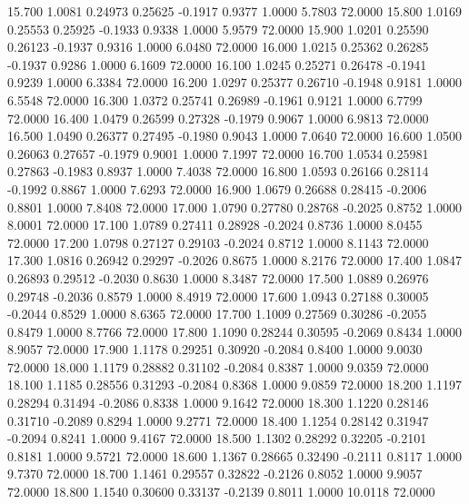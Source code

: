   15.700   1.0081   0.24973   0.25625  -0.1917   0.9377   1.0000   5.7803  72.0000
  15.800   1.0169   0.25553   0.25925  -0.1933   0.9338   1.0000   5.9579  72.0000
  15.900   1.0201   0.25590   0.26123  -0.1937   0.9316   1.0000   6.0480  72.0000
  16.000   1.0215   0.25362   0.26285  -0.1937   0.9286   1.0000   6.1609  72.0000
  16.100   1.0245   0.25271   0.26478  -0.1941   0.9239   1.0000   6.3384  72.0000
  16.200   1.0297   0.25377   0.26710  -0.1948   0.9181   1.0000   6.5548  72.0000
  16.300   1.0372   0.25741   0.26989  -0.1961   0.9121   1.0000   6.7799  72.0000
  16.400   1.0479   0.26599   0.27328  -0.1979   0.9067   1.0000   6.9813  72.0000
  16.500   1.0490   0.26377   0.27495  -0.1980   0.9043   1.0000   7.0640  72.0000
  16.600   1.0500   0.26063   0.27657  -0.1979   0.9001   1.0000   7.1997  72.0000
  16.700   1.0534   0.25981   0.27863  -0.1983   0.8937   1.0000   7.4038  72.0000
  16.800   1.0593   0.26166   0.28114  -0.1992   0.8867   1.0000   7.6293  72.0000
  16.900   1.0679   0.26688   0.28415  -0.2006   0.8801   1.0000   7.8408  72.0000
  17.000   1.0790   0.27780   0.28768  -0.2025   0.8752   1.0000   8.0001  72.0000
  17.100   1.0789   0.27411   0.28928  -0.2024   0.8736   1.0000   8.0455  72.0000
  17.200   1.0798   0.27127   0.29103  -0.2024   0.8712   1.0000   8.1143  72.0000
  17.300   1.0816   0.26942   0.29297  -0.2026   0.8675   1.0000   8.2176  72.0000
  17.400   1.0847   0.26893   0.29512  -0.2030   0.8630   1.0000   8.3487  72.0000
  17.500   1.0889   0.26976   0.29748  -0.2036   0.8579   1.0000   8.4919  72.0000
  17.600   1.0943   0.27188   0.30005  -0.2044   0.8529   1.0000   8.6365  72.0000
  17.700   1.1009   0.27569   0.30286  -0.2055   0.8479   1.0000   8.7766  72.0000
  17.800   1.1090   0.28244   0.30595  -0.2069   0.8434   1.0000   8.9057  72.0000
  17.900   1.1178   0.29251   0.30920  -0.2084   0.8400   1.0000   9.0030  72.0000
  18.000   1.1179   0.28882   0.31102  -0.2084   0.8387   1.0000   9.0359  72.0000
  18.100   1.1185   0.28556   0.31293  -0.2084   0.8368   1.0000   9.0859  72.0000
  18.200   1.1197   0.28294   0.31494  -0.2086   0.8338   1.0000   9.1642  72.0000
  18.300   1.1220   0.28146   0.31710  -0.2089   0.8294   1.0000   9.2771  72.0000
  18.400   1.1254   0.28142   0.31947  -0.2094   0.8241   1.0000   9.4167  72.0000
  18.500   1.1302   0.28292   0.32205  -0.2101   0.8181   1.0000   9.5721  72.0000
  18.600   1.1367   0.28665   0.32490  -0.2111   0.8117   1.0000   9.7370  72.0000
  18.700   1.1461   0.29557   0.32822  -0.2126   0.8052   1.0000   9.9057  72.0000
  18.800   1.1540   0.30600   0.33137  -0.2139   0.8011   1.0000  10.0118  72.0000
